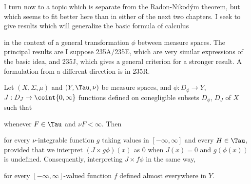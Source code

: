 
\def\chaptername{The Radon-Nikod\'ym theorem}
\def\sectionname{Measurable transformations}
\def\tildeTau{\tilde{\text{T}}}


I turn now to a topic which is separate from the
Radon-Nikod\'ym theorem, but which seems to fit better here than in
either of the next two chapters.   I seek to give results which will
generalize the basic formula of calculus


\noindent in the context of a general transformation $\phi$ between
measure spaces.   The principal results are I suppose 235A/235E, which
are very similar expressions of the basic idea, and 235J, which gives a
general criterion for a stronger result.   A formulation from a
different direction is in 235R.

 Let $(X,\Sigma,\mu)$ and $(Y,\Tau,\nu)$ be
measure spaces, and $\phi:D_{\phi}\to Y$, $J:D_J\to\coint{0,\infty}$
functions defined on conegligible subsets $D_{\phi}$, $D_J$ of $X$
such that


\noindent whenever $F\in\Tau$ and $\nu F<\infty$.   Then


\noindent for every $\nu$-integrable function $g$ taking values in
$[-\infty,\infty]$ and every $H\in\Tau$, provided that
we interpret $(J\times g\phi)(x)$ as $0$ when $J(x)=0$ and $g(\phi(x))$
is undefined.   Consequently, interpreting $J\times f\phi$ in the same way,


\noindent for every $[-\infty,\infty]$-valued function $f$ defined almost
everywhere in $Y$.

